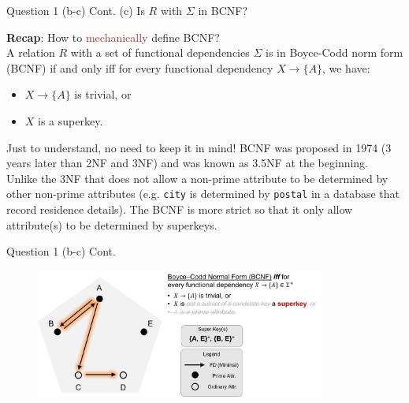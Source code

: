 \begin{frame}[fragile]{Question 1 (b-c) Cont.}
(c) Is $R$ with $\Sigma$ in BCNF?\\\vspace{10pt}

\textbf{Recap}: How to \textcolor{brown}{mechanically} define BCNF?\\\vspace{10pt}
A relation $R$ with a set of functional dependencies $\Sigma$ is in Boyce-Codd norm form (BCNF) if and only iff for every functional dependency $X\rightarrow\{A\}$, we have:
\begin{itemize}
	\item $X\rightarrow\{A\}$ is trivial, or
	\item $X$ is a superkey.
\end{itemize}\vspace{3pt}

\begin{alertblock}{Just to understand, no need to keep it in mind!}
BCNF was proposed in 1974 (3 years later than 2NF and 3NF) and was known as 3.5NF at the beginning.\\\vspace{3pt}
Unlike the 3NF that does not allow a non-prime attribute to be determined by other non-prime attributes (e.g. \texttt{city} is determined by \texttt{postal} in a database that record residence details). 
The BCNF is more strict so that it only allow attribute(s) to be determined by superkeys.
\end{alertblock}

\end{frame}

\begin{frame}[fragile]{Question 1 (b-c) Cont.}
\begin{figure}
	\includegraphics[width=0.85\textwidth, trim=0 0 0 0, clip]{t5/images/q3_bcnf_highlight.png}
\end{figure}
\end{frame}

